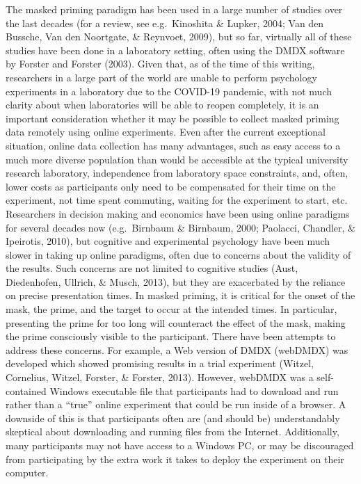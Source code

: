 \documentclass[
  english,
  man]{apa6}
\begin{document}
The masked priming paradigm has been used in a large number of studies over the last decades (for a review, see e.g.~Kinoshita \& Lupker, 2004; Van den Bussche, Van den Noortgate, \& Reynvoet, 2009), but so far, virtually all of these studies have been done in a laboratory setting, often using the DMDX software by Forster and Forster (2003). Given that, as of the time of this writing, researchers in a large part of the world are unable to perform psychology experiments in a laboratory due to the COVID-19 pandemic, with not much clarity about when laboratories will be able to reopen completely, it is an important consideration whether it may be possible to collect masked priming data remotely using online experiments. Even after the current exceptional situation, online data collection has many advantages, such as easy access to a much more diverse population than would be accessible at the typical university research laboratory, independence from laboratory space constraints, and, often, lower costs as participants only need to be compensated for their time on the experiment, not time spent commuting, waiting for the experiment to start, etc. Researchers in decision making and economics have been using online paradigms for several decades now (e.g.~Birnbaum \& Birnbaum, 2000; Paolacci, Chandler, \& Ipeirotis, 2010), but cognitive and experimental psychology have been much slower in taking up online paradigms, often due to concerns about the validity of the results. Such concerns are not limited to cognitive studies (Aust, Diedenhofen, Ullrich, \& Musch, 2013), but they are exacerbated by the reliance on precise presentation times. In masked priming, it is critical for the onset of the mask, the prime, and the target to occur at the intended times. In particular, presenting the prime for too long will counteract the effect of the mask, making the prime consciously visible to the participant. There have been attempts to address these concerns. For example, a Web version of DMDX (webDMDX) was developed which showed promising results in a trial experiment (Witzel, Cornelius, Witzel, Forster, \& Forster, 2013). However, webDMDX was a self-contained Windows executable file that participants had to download and run rather than a \enquote{true} online experiment that could be run inside of a browser. A downside of this is that participants often are (and should be) understandably skeptical about downloading and running files from the Internet. Additionally, many participants may not have access to a Windows PC, or may be discouraged from participating by the extra work it takes to deploy the experiment on their computer.
\end{document}
